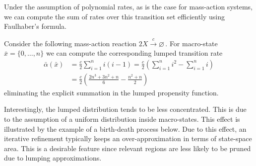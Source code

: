 Under the assumption of polynomial rates, as is the case for mass-action
systems, we can compute the sum of rates over this transition set
efficiently using Faulhaber's formula.
\begin{example}
Consider the following mass-action reaction
$ 2 X \xrightarrow{c} \varnothing\,. $
For macro-state
$\bar{x} = \{0, \dots, n\}$
we can compute the corresponding lumped transition rate
\begin{align*}
	\bar{\alpha}(\bar{x})
	& =\frac{c}{2}\sum_{i=1}^n i (i - 1) 
	=\frac{c}{2}\left(\sum_{i=1}^n i^2 - \sum_{i=1}^ni\right)\\
	& =\frac{c}{2}\left(\frac{2n^3+3n^2+n}{6} - \frac{n^2 + n}{2}\right)
\end{align*}
eliminating the explicit summation in the lumped propensity function.
\end{example}

Interestingly, the lumped distribution
tends to be less concentrated. %
This is due to the assumption of a
uniform distribution inside macro-states.
This effect is illustrated by the example of a birth-death process below.
Due to this effect, an iterative refinement typically keeps an over-approximation in terms of state-space area.
This is a desirable feature since relevant regions are less likely to be pruned due to lumping approximations.

